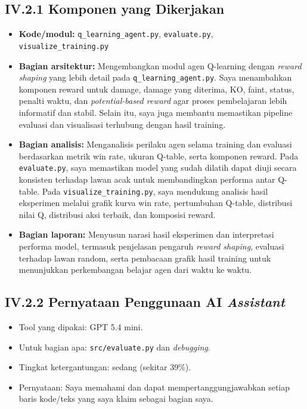\documentclass[11pt,a4paper,oneside]{report}
\begin{document}
\subsection*{IV.2.1 Komponen yang Dikerjakan}
\begin{itemize}[leftmargin=*]
    \item \textbf{Kode/modul:} \texttt{q\_learning\_agent.py}, \texttt{evaluate.py}, \texttt{visualize\_training.py}
    \item \textbf{Bagian arsitektur:} Mengembangkan modul agen Q-learning dengan \emph{reward shaping} yang lebih detail pada \texttt{q\_learning\_agent.py}. Saya menambahkan komponen reward untuk damage, damage yang diterima, KO, faint, status, penalti waktu, dan \emph{potential-based reward} agar proses pembelajaran lebih informatif dan stabil. Selain itu, saya juga membantu memastikan pipeline evaluasi dan visualisasi terhubung dengan hasil training.
    \item \textbf{Bagian analisis:} Menganalisis perilaku agen selama training dan evaluasi berdasarkan metrik win rate, ukuran Q-table, serta komponen reward. Pada \texttt{evaluate.py}, saya memastikan model yang sudah dilatih dapat diuji secara konsisten terhadap lawan acak untuk membandingkan performa antar Q-table. Pada \texttt{visualize\_training.py}, saya mendukung analisis hasil eksperimen melalui grafik kurva win rate, pertumbuhan Q-table, distribusi nilai Q, distribusi aksi terbaik, dan komposisi reward.
    \item \textbf{Bagian laporan:} Menyusun narasi hasil eksperimen dan interpretasi performa model, termasuk penjelasan pengaruh \emph{reward shaping}, evaluasi terhadap lawan random, serta pembacaan grafik hasil training untuk menunjukkan perkembangan belajar agen dari waktu ke waktu.
\end{itemize}

\subsection*{IV.2.2 Pernyataan Penggunaan AI \textit{Assistant}}
\begin{itemize}[leftmargin=*]
  \item Tool yang dipakai: GPT 5.4 mini.
  \item Untuk bagian apa: \texttt{src/evaluate.py} dan \textit{debugging}.
  \item Tingkat ketergantungan: sedang (sekitar 39\%).
  \item Pernyataan: Saya memahami dan dapat mempertanggungjawabkan setiap baris kode/teks yang saya klaim sebagai bagian saya.
\end{itemize}
\end{document}
